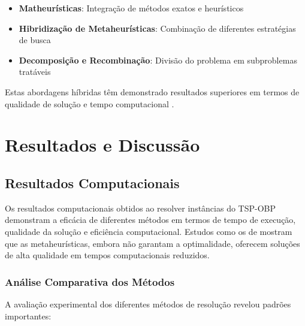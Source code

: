 \documentclass[12pt, a4paper]{report}
\begin{document}
\begin{itemize}
    \item \textbf{Matheurísticas}: Integração de métodos exatos e heurísticos
    \item \textbf{Hibridização de Metaheurísticas}: Combinação de diferentes estratégias de busca
    \item \textbf{Decomposição e Recombinação}: Divisão do problema em subproblemas tratáveis
\end{itemize}

Estas abordagens híbridas têm demonstrado resultados superiores em termos de qualidade de solução e tempo computacional \cite{carvalho2022}.

\chapter{Resultados e Discussão}

\section{Resultados Computacionais}
Os resultados computacionais obtidos ao resolver instâncias do TSP-OBP demonstram a eficácia de diferentes métodos em termos de tempo de execução, qualidade da solução e eficiência computacional. Estudos como os de \cite{carvalho2022} mostram que as metaheurísticas, embora não garantam a optimalidade, oferecem soluções de alta qualidade em tempos computacionais reduzidos.

\subsection{Análise Comparativa dos Métodos}
A avaliação experimental dos diferentes métodos de resolução revelou padrões importantes:
\end{document}
